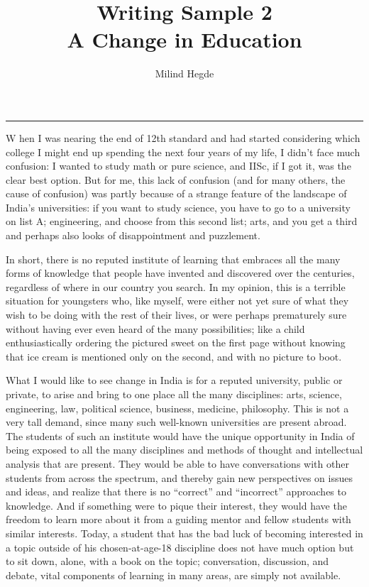 \documentclass[11pt,a4paper]{article}
\title{\vspace*{-0.35in}\Large{Writing Sample 2}\\\bigskip \huge{\color{spot}A Change in Education}\vspace{-0.2cm}}
\author{Milind Hegde}
\date{}
\begin{document}
\fontsize{11.25}{18}\selectfont
\setlength{\parskip}{0.15cm plus4mm minus3mm}
\maketitle
\thispagestyle{empty}

\begin{center}
\textcolor{spot}{\rule[2cm]{\textwidth}{1.5pt}}
\vspace*{-2.4cm}
\end{center}

\lettrine[lines=2, findent = 1pt, nindent = 3pt, loversize=0.05]{W}{} hen I was nearing the end of 12th standard and had started considering which college I might end up spending the next four years of my life, I didn't face much confusion: I wanted to study math or pure science, and IISc, if I got it, was the clear best option. But for me, this lack of confusion (and for many others, the cause of confusion) was partly because of a strange feature of the landscape of India's universities: if you want to study science, you have to go to a university on list A; engineering, and choose from this second list; arts, and you get a third and perhaps also looks of disappointment and puzzlement. 

In short, there is no reputed institute of learning that embraces all the many forms of knowledge that people have invented and discovered over the centuries, regardless of where in our country you search. In my opinion, this is a terrible situation for youngsters who, like myself, were either not yet sure of what they wish to be doing with the rest of their lives, or were perhaps prematurely sure without having ever even heard of the many possibilities; like a child enthusiastically ordering the pictured sweet on the first page without knowing that ice cream is mentioned only on the second, and with no picture to boot.

What I would like to see change in India is for a reputed university, public or private, to arise and bring to one place all the many disciplines: arts, science, engineering, law, political science, business, medicine, philosophy. This is not a very tall demand, since many such well-known universities are present abroad. The students of such an institute would have the unique opportunity in India of being exposed to all the many disciplines and methods of thought and intellectual analysis that are present. They would be able to have conversations with other students from across the spectrum, and thereby gain new perspectives on issues and ideas, and realize that there is no “correct” and “incorrect” approaches to knowledge. And if something were to pique their interest, they would have the freedom to learn more about it from a guiding mentor and fellow students with similar interests. Today, a student that has the bad luck of becoming interested in a topic outside of his chosen-at-age-18 discipline does not have much option but to sit down, alone, with a book on the topic; conversation, discussion, and debate, vital components of learning in many areas, are simply not available.
\end{document}
